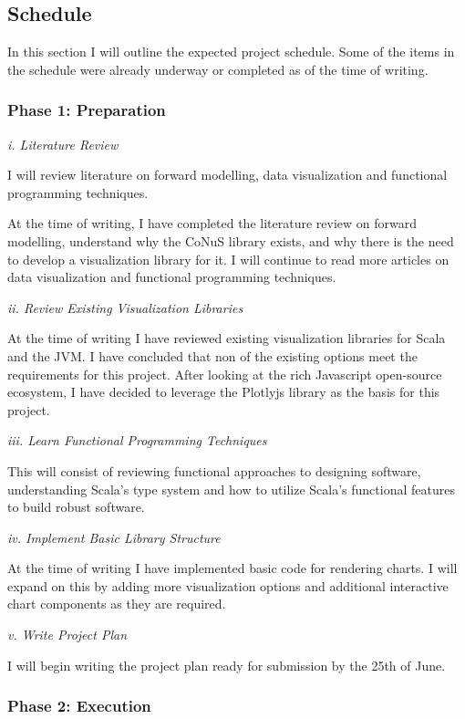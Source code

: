 \documentclass[12pt]{article}
\begin{document}
\subsection{Schedule}
In this section I will outline the expected project schedule. Some of the items in the schedule were already underway or completed as of the time of writing.

\subsubsection{Phase 1: Preparation}

\textit{i. Literature Review}

I will review literature on forward modelling, data visualization and functional programming techniques. 

At the time of writing, I have completed the literature review on forward modelling, understand why the CoNuS library exists, and why there is the need to develop a visualization library for it. I will continue to read more articles on data visualization and functional programming techniques.

\textit{ii. Review Existing Visualization Libraries}

At the time of writing I have reviewed existing visualization libraries for Scala and the JVM. I have concluded that non of the existing options meet the requirements for this project. After looking at the rich Javascript open-source ecosystem, I have decided to leverage the Plotlyjs library as the basis for this project.

\textit{iii. Learn Functional Programming Techniques}

This will consist of reviewing functional approaches to designing software, understanding Scala's type system and how to utilize Scala's functional features to build robust software.

\textit{iv. Implement Basic Library Structure}

At the time of writing I have implemented basic code for rendering charts. I will expand on this by adding more visualization options and additional interactive chart components as they are required.

\textit{v. Write Project Plan}

I will begin writing the project plan ready for submission by the 25th of June.

\subsubsection{Phase 2: Execution}
\end{document}
